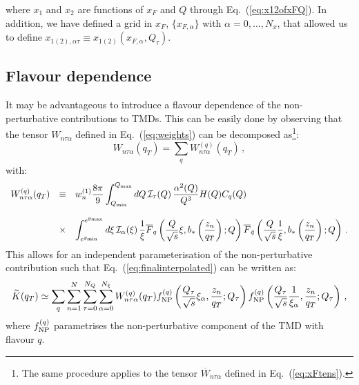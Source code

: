 \documentclass[10pt,a4paper]{article}
\begin{document}
where $x_1$ and $x_2$ are functions of $x_F$ and $Q$ through
Eq.~(\ref{eq:x12ofxFQ}). In addition, we have defined a grid in $x_F$,
$\{x_{F,\alpha}\}$ with $\alpha = 0,\dots,N_x$, that allowed us to
define $x_{1(2),\alpha\tau}\equiv x_{1(2)}(x_{F,\alpha},Q_\tau)$.

\subsection{Flavour dependence}

It may be advantageous to introduce a flavour dependence of the
non-perturbative contributions to TMDs. This can be easily done by
observing that the tensor $W_{n\tau\alpha}$ defined in
Eq.~(\ref{eq:weights}) can be decomposed as\footnote{The same
  procedure applies to the tensor $\overline{W}_{n\tau\alpha}$ defined
in Eq.~(\ref{eq:xFtens}).}:
\begin{equation}
W_{n\tau\alpha}(q_T) = \sum_q W_{n\tau\alpha}^{(q)} (q_T)\,,
\end{equation}
with:
\begin{equation}\label{eq:weightsfl}
\begin{array}{rcl}
  \displaystyle  W_{n\tau\alpha}^{(q)}(q_T) & \equiv & \displaystyle w_n^{(1)}\frac{8\pi}{9} \int_{Q_{\rm min}}^{Q_{\rm max}}dQ\,\mathcal{I}_\tau(Q)\, 
                                            \frac{\alpha^2(Q)}{Q^3} H(Q) C_q(Q)
                                            \\
  \\
                                 &\times& \displaystyle 
                                          \int_{e^{y_{\rm
                                          min}}}^{e^{y_{\rm max}}}d\xi\,\mathcal{I}_\alpha(\xi)\,\frac{1}{\xi} \overline{F}_q\left(\frac{Q}{\sqrt{s}}\xi,b_*\left(\frac{z_n}{q_T}\right);Q\right)
                                          \overline{F}_{\bar{q}}\left(\frac{Q}{\sqrt{s}}\frac1{\xi},b_*\left(\frac{z_n}{q_T}\right);Q\right)\,.
\end{array}
\end{equation}
This allows for an independent parameterisation of the
non-perturbative contribution such that
Eq.~(\ref{eq:finalinterpolated}) can be written as:
\begin{equation}\label{eq:finalinterpolatedfl}
\widetilde{K}(q_T) \simeq \sum_q\sum_{n=1}^N
  \sum_{\tau=0}^{N_Q}\sum_{\alpha=0}^{N_\xi} W_{n\tau\alpha}^{(q)}(q_T) f_{\rm NP}^{(q)}\left(\frac{Q_\tau}{\sqrt{s}}\xi_\alpha,\frac{z_n}{q_T};Q_\tau\right) f_{\rm NP}^{(q)}\left(\frac{Q_\tau}{\sqrt{s}}\frac1{\xi_\alpha},\frac{z_n}{q_T};Q_\tau\right)\,,
\end{equation}
where $f_{\rm NP}^{(q)}$ parametrises the non-perturbative component
of the TMD with flavour $q$.
\end{document}
